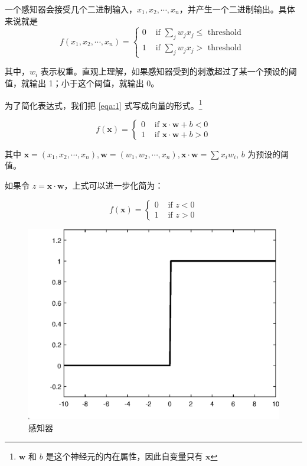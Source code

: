 \documentclass{ctexart}
\numberwithin{equation}{section}    %
\begin{document}
一个感知器会接受几个二进制输入，$x_1,x_2,\cdots,x_n$，并产生一个二进制输出。具体来说就是
\begin{equation}
    \label{eqa:1}
    f(x_1,x_2,\cdots,x_n)=\left\{\begin{array}{ll}
        0 & \text { if } \sum_{j} w_{j} x_{j} \leq \text { threshold } \\
        1 & \text { if } \sum_{j} w_{j} x_{j}>\text { threshold }
        \end{array}\right.
\end{equation}

其中，$w_i$ 表示权重。直观上理解，如果感知器受到的刺激超过了某一个预设的阈值，就输出 1；小于这个阈值，就输出 0。

为了简化表达式，我们把 \eqref{eqa:1} 式写成向量的形式。\footnote{$\mathbf{w}$ 和 $b$ 是这个神经元的内在属性，因此自变量只有 $\mathbf{x}$}

\begin{equation}
    f(\mathbf{x})=\left\{\begin{array}{ll}
        0 & \text { if } \mathbf{x}\cdot \mathbf{w}+b<0 \\
        1 & \text { if } \mathbf{x}\cdot \mathbf{w}+b>0
        \end{array}\right.
\end{equation}

其中 $\mathbf{x}=(x_1,x_2,\cdots,x_n),\mathbf{w}=(w_1,w_2,\cdots,x_n),\mathbf{x}\cdot\mathbf{w}=\sum x_iw_i$, $b$ 为预设的阈值。

如果令 $z=\mathbf{x}\cdot\mathbf{w}$，上式可以进一步化简为：

\begin{equation}
    f(\mathbf{x})=\left\{\begin{array}{ll}
        0 & \text { if } z<0 \\
        1 & \text { if } z>0
        \end{array}\right.
\end{equation}

\begin{figure}[htp]
    \centering
    \includegraphics[width=0.7\linewidth]{fig/感知器}
    \caption{感知器}
    \label{fig:}
\end{figure}
\end{document}
